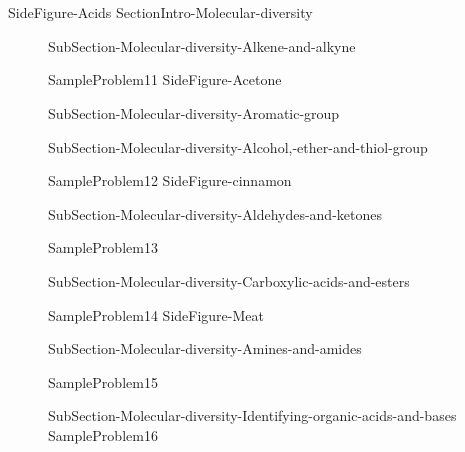 \documentclass[main.tex]{subfiles}
\begin{document}
\section{\color{blue!30!black}{Molecular diversity}}
{SideFigure-Acids}
 {SectionIntro-Molecular-diversity}\sloppy
\begin{description}
\item[]{SubSection-Molecular-diversity-Alkene-and-alkyne}

{SampleProblem11}
 {SideFigure-Acetone}

 \item[]{SubSection-Molecular-diversity-Aromatic-group}
 \hspace{-2cm}{Table-Functional-groups}


\item[]{SubSection-Molecular-diversity-Alcohol,-ether-and-thiol-group}

{SampleProblem12}
{SideFigure-cinnamon}

\item[] {SubSection-Molecular-diversity-Aldehydes-and-ketones}

{SampleProblem13}

\item[]{SubSection-Molecular-diversity-Carboxylic-acids-and-esters}

{SampleProblem14}
 {SideFigure-Meat}

 \item[] {SubSection-Molecular-diversity-Amines-and-amides}

{SampleProblem15}
\item[]{SubSection-Molecular-diversity-Identifying-organic-acids-and-bases}
{SampleProblem16}

 \end{description}



\clearpage\thispagestyle{empty}\mbox{}\clearpage
\end{document}
